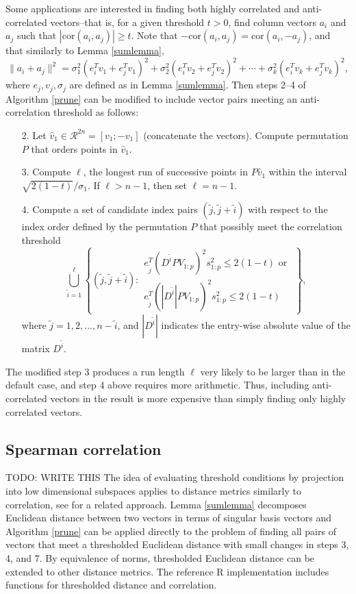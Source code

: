\documentclass{article}
\let\proglang=\textsf
\numberwithin{algorithmctr}{section}
\begin{document}
Some applications are interested in finding both highly correlated and
anti-correlated vectors--that is, for a given threshold $t > 0$, find column
vectors $a_i$ and $a_j$ such that $|\mbox{cor}(a_i, a_j)| \ge t$.
Note that $-\mbox{cor}(a_i, a_j) = \mbox{cor}(a_i, -a_j)$, and that
similarly to Lemma \ref{sumlemma},
\begin{equation*}
\|a_i + a_j\|^2 =
\sigma_1^2 (e_i^Tv_{1} + e_j^Tv_{1})^2 + 
\sigma_2^2 (e_i^Tv_{2} + e_j^Tv_{2})^2 + \cdots + 
\sigma_k^2 (e_i^Tv_{k} + e_j^Tv_{k})^2,
\end{equation*}
where $e_j, v_j, \sigma_j$ are defined as in Lemma \ref{sumlemma}.
Then steps 2--4 of Algorithm \ref{prune} can be modified to include vector pairs meeting an
anti-correlation threshold as follows:
\begin{enumerate}
\item[2.] Let $\hat{v}_1\in\mathcal{R}^{2n}=[v_1; -v_1]$ (concatenate the vectors). Compute permutation
$P$ that orders points in $\hat{v}_1$.
\item[3.] Compute $\ell$, the longest run of successive points in $P \hat{v}_1$ within the interval $\sqrt{2(1-t)}/\sigma_1$. If $\ell > n-1$, then set $\ell = n-1$.
\item[4.] Compute a set of candidate index pairs $(\tilde{j},\tilde{j}+\tilde{i})$ with respect to the index order defined by the permutation $P$ that possibly meet the correlation threshold
\[
\bigcup_{\tilde{i}=1}^\ell
\left\{
(\tilde{j},\tilde{j}+\tilde{i}) :
\begin{array}{l}
e_{\tilde{j}}^T(D^{\tilde{i}} P V_{1:p} )^2 s_{1:p}^2 \le 2(1-t) \mbox{ or }
\\
e_{\tilde{j}}^T(|D^{\tilde{i}}| P V_{1:p} )^2 s_{1:p}^2 \le 2(1-t)
\end{array}
\right\},
\]
where $\tilde{j}=1,2,\ldots,n-\tilde{i}$, and $|D^{\tilde{i}}|$ indicates the entry-wise
absolute value of the matrix $D^{\tilde{i}}$.
\end{enumerate}
The modified step 3 produces a run length $\ell$ very likely to be larger than
in the default case, and step 4 above requires more arithmetic. Thus, including
anti-correlated vectors in the result is more expensive than simply finding
only highly correlated vectors.

\subsection{Spearman correlation}

TODO: WRITE THIS
The idea of evaluating threshold conditions by projection into low dimensional
subspaces applies to distance metrics similarly to correlation, see
\cite{svd-similarity} for a related approach. Lemma \ref{sumlemma} decomposes
Euclidean distance between two vectors in terms of singular basis vectors and
Algorithm \ref{prune} can be applied directly to the problem of finding all
pairs of vectors that meet a thresholded Euclidean distance with small changes
in steps 3, 4, and 7.  By equivalence of norms, thresholded Euclidean distance
can be extended to other distance metrics. The reference \proglang{R}
implementation \cite{sup} includes functions for thresholded distance and
correlation.
\end{document}
